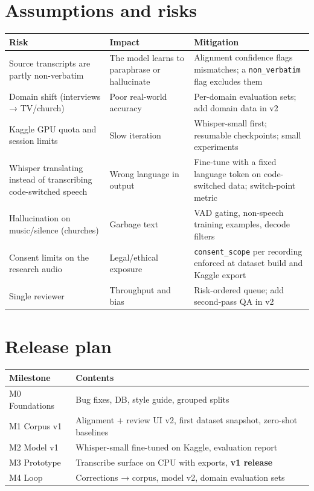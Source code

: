 \documentclass[11pt]{article}
\begin{document}
\hypertarget{assumptions-and-risks}{%
\section{Assumptions and risks}\label{assumptions-and-risks}}

\begin{longtable}[]{@{}>{\raggedright\arraybackslash}p{}>{\raggedright\arraybackslash}p{}>{\raggedright\arraybackslash}p{}@{}}
\toprule\noalign{}
Risk & Impact & Mitigation \\
\midrule\noalign{}
\endhead
\bottomrule\noalign{}
\endlastfoot
Source transcripts are partly non-verbatim & The model learns to paraphrase or hallucinate & Alignment confidence flags mismatches; a \texttt{non\_\allowbreak{}verbatim} flag excludes them \\
Domain shift (interviews → TV/church) & Poor real-world accuracy & Per-domain evaluation sets; add domain data in v2 \\
Kaggle GPU quota and session limits & Slow iteration & Whisper-small first; resumable checkpoints; small experiments \\
Whisper translating instead of transcribing code-switched speech & Wrong language in output & Fine-tune with a fixed language token on code-switched data; switch-point metric \\
Hallucination on music/silence (churches) & Garbage text & VAD gating, non-speech training examples, decode filters \\
Consent limits on the research audio & Legal/ethical exposure & \texttt{consent\_\allowbreak{}scope} per recording enforced at dataset build and Kaggle export \\
Single reviewer & Throughput and bias & Risk-ordered queue; add second-pass QA in v2 \\
\end{longtable}

\hypertarget{release-plan}{%
\section{Release plan}\label{release-plan}}

\begin{longtable}[]{@{}>{\raggedright\arraybackslash}p{}>{\raggedright\arraybackslash}p{}@{}}
\toprule\noalign{}
Milestone & Contents \\
\midrule\noalign{}
\endhead
\bottomrule\noalign{}
\endlastfoot
M0 Foundations & Bug fixes, DB, style guide, grouped splits \\
M1 Corpus v1 & Alignment + review UI v2, first dataset snapshot, zero-shot baselines \\
M2 Model v1 & Whisper-small fine-tuned on Kaggle, evaluation report \\
M3 Prototype & Transcribe surface on CPU with exports, \textbf{v1 release} \\
M4 Loop & Corrections → corpus, model v2, domain evaluation sets \\
\end{longtable}
\end{document}
